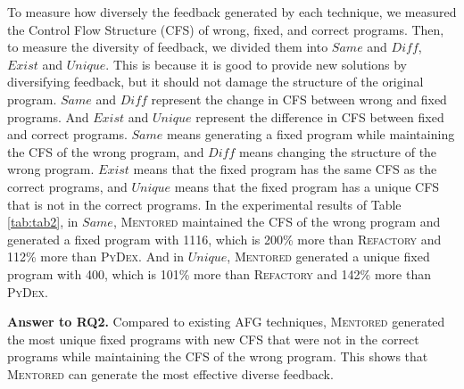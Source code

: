 \documentclass[10pt,conference]{IEEEtran}
\begin{document}
        To measure how diversely the feedback generated by each technique, we measured the Control Flow Structure (CFS) of wrong, fixed, and correct programs. Then, to measure the diversity of feedback, we divided them into $Same$ and $Diff$, $Exist$ and $Unique$. This is because it is good to provide new solutions by diversifying feedback, but it should not damage the structure of the original program. $Same$ and $Diff$ represent the change in CFS between wrong and fixed programs. And $Exist$ and $Unique$ represent the difference in CFS between fixed and correct programs. $Same$ means generating a fixed program while maintaining the CFS of the wrong program, and $Diff$ means changing the structure of the wrong program. $Exist$ means that the fixed program has the same CFS as the correct programs, and $Unique$ means that the fixed program has a unique CFS that is not in the correct programs. In the experimental results of Table \ref{tab:tab2}, in $Same$, \textsc{Mentored} maintained the CFS of the wrong program and generated a fixed program with 1116, which is 200\% more than \textsc{Refactory} and 112\% more than \textsc{PyDex}. And in $Unique$, \textsc{Mentored} generated a unique fixed program with 400, which is 101\% more than \textsc{Refactory} and 142\% more than \textsc{PyDex}.

        \begin{tcolorbox}
            \textbf{Answer to RQ2.}
            Compared to existing AFG techniques, \textsc{Mentored} generated the most unique fixed programs with new CFS that were not in the correct programs while maintaining the CFS of the wrong program. This shows that \textsc{Mentored} can generate the most effective diverse feedback.
        \end{tcolorbox}
\end{document}
